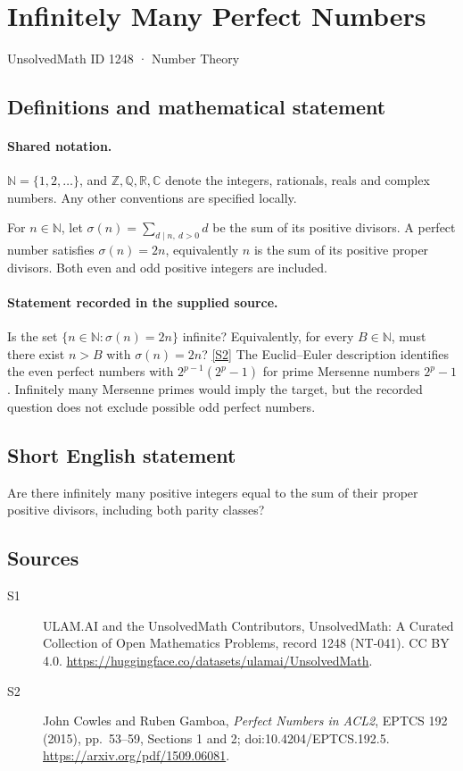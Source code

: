 \documentclass[11pt]{article}
\newcommand{\sref}[2]{\hyperlink{source:#1:#2}{[S#2]}}
\begin{document}
\setcounter{section}{1247}
\section{Infinitely Many Perfect Numbers}\label{1248}
{\small\sffamily UnsolvedMath ID 1248 · Number Theory}
\subsection{Definitions and mathematical statement}

\paragraph{Shared notation.}$\mathbb N=\{1,2,\ldots\}$, and $\mathbb Z,\mathbb Q,\mathbb R,\mathbb C$ denote the integers, rationals, reals and complex numbers. Any other conventions are specified locally.


For $n\in\mathbb N$, let $\sigma(n)=\sum_{d\mid n,\ d>0}d$ be the sum of its positive divisors. A perfect number satisfies $\sigma(n)=2n$, equivalently $n$ is the sum of its positive proper divisors. Both even and odd positive integers are included.
\paragraph{Statement recorded in the supplied source.}
Is the set $\{n\in\mathbb N:\sigma(n)=2n\}$ infinite? Equivalently, for every $B\in\mathbb N$, must there exist $n>B$ with $\sigma(n)=2n$? \sref{1248}{2}
The Euclid--Euler description identifies the even perfect numbers with $2^{p-1}(2^p-1)$ for prime Mersenne numbers $2^p-1$. Infinitely many Mersenne primes would imply the target, but the recorded question does not exclude possible odd perfect numbers.
\subsection{Short English statement}
Are there infinitely many positive integers equal to the sum of their proper positive divisors, including both parity classes?
\subsection{Sources}
\begin{description}
\item[\hypertarget{source:1248:1}{S1}] ULAM.AI and the UnsolvedMath Contributors, UnsolvedMath: A Curated Collection of Open Mathematics Problems, record 1248 (NT-041). CC BY 4.0. \url{https://huggingface.co/datasets/ulamai/UnsolvedMath}.
\item[\hypertarget{source:1248:2}{S2}] John Cowles and Ruben Gamboa, \emph{Perfect Numbers in ACL2}, EPTCS 192 (2015), pp.\ 53--59, Sections 1 and 2; doi:10.4204/EPTCS.192.5. \url{https://arxiv.org/pdf/1509.06081}.
\end{description}
\label{end:1248}
\end{document}
